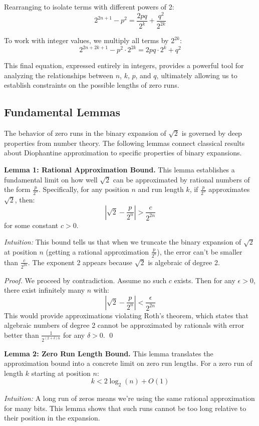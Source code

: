 Rearranging to isolate terms with different powers of 2:
\[
2^{2n+1} - p^2 = \frac{2pq}{2^k} + \frac{q^2}{2^{2k}}
\]

To work with integer values, we multiply all terms by $2^{2k}$:
\[
2^{2n+2k+1} - p^2 \cdot 2^{2k} = 2pq \cdot 2^k + q^2
\]

This final equation, expressed entirely in integers, provides a powerful tool for analyzing the relationships between $n$, $k$, $p$, and $q$, ultimately allowing us to establish constraints on the possible lengths of zero runs.

\subsection{Fundamental Lemmas}
The behavior of zero runs in the binary expansion of $\sqrt{2}$ is governed by deep properties from number theory. The following lemmas connect classical results about Diophantine approximation to specific properties of binary expansions.

\textbf{Lemma 1: Rational Approximation Bound.} 
This lemma establishes a fundamental limit on how well $\sqrt{2}$ can be approximated by rational numbers of the form $\frac{p}{2^n}$. Specifically, for any position $n$ and run length $k$, if $\frac{p}{2^n}$ approximates $\sqrt{2}$, then:
\[
\left|\sqrt{2} - \frac{p}{2^n}\right| > \frac{c}{2^{2n}}
\]
for some constant $c > 0$.

\textit{Intuition:} This bound tells us that when we truncate the binary expansion of $\sqrt{2}$ at position $n$ (getting a rational approximation $\frac{p}{2^n}$), the error can't be smaller than $\frac{c}{2^{2n}}$. The exponent 2 appears because $\sqrt{2}$ is algebraic of degree 2.

\textit{Proof.} We proceed by contradiction. Assume no such $c$ exists. Then for any $\epsilon > 0$, there exist infinitely many $n$ with:
\[
\left|\sqrt{2} - \frac{p}{2^n}\right| < \frac{\epsilon}{2^{2n}}
\]
This would provide approximations violating Roth's theorem, which states that algebraic numbers of degree 2 cannot be approximated by rationals with error better than $\frac{1}{2^{(2+\delta)n}}$ for any $\delta > 0$. \qed

\textbf{Lemma 2: Zero Run Length Bound.} 
This lemma translates the approximation bound into a concrete limit on zero run lengths. For a zero run of length $k$ starting at position $n$:
\[
k < 2 \log_2(n) + O(1)
\]

\textit{Intuition:} A long run of zeros means we're using the same rational approximation for many bits. This lemma shows that such runs cannot be too long relative to their position in the expansion.


